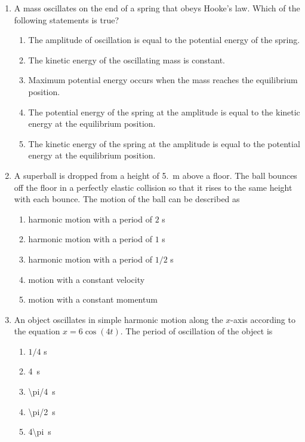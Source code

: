 \documentclass{../../oss-apphys}
\begin{document}
\begin{multicols}{2}
\begin{enumerate}[leftmargin=18pt]
  \item A mass oscillates on the end of a spring that obeys Hooke's law. Which
    of the following statements is true?
    \begin{enumerate}[noitemsep,topsep=0pt,leftmargin=18pt,label=(\Alph*)]
    \item The amplitude of oscillation is equal to the potential energy of the
      spring.
    \item The kinetic energy of the oscillating mass is constant.
    \item Maximum potential energy occurs when the mass reaches the
      equilibrium position.
    \item The potential energy of the spring at the amplitude is equal to the
      kinetic energy at the equilibrium position.
    \item The kinetic energy of the spring at the amplitude is equal to the
      potential energy at the equilibrium position.
    \end{enumerate}

  \item A superball is dropped from a height of \SI{5.}{\metre} above a floor.
    The ball bounces off the floor in a perfectly elastic collision so that it
    rises to the same height with each bounce. The motion of the ball can be
    described as
    \begin{enumerate}[noitemsep,topsep=0pt,leftmargin=18pt,label=(\Alph*)]
    \item harmonic motion with a period of $2$ \si{\second}
    \item harmonic motion with a period of $1$ \si{\second}
    \item harmonic motion with a period of $1/2$ \si{\second}
    \item motion with a constant velocity
    \item motion with a constant momentum
    \end{enumerate}

  \item An object oscillates in simple harmonic motion along the $x$-axis
    according to the equation $x = 6 \cos(4t)$. The period of oscillation of the
    object is
    \begin{enumerate}[noitemsep,topsep=0pt,leftmargin=18pt,label=(\Alph*)]
    \item $1/4$ \si{\second}
    \item\SI{4}{\second}
    \item\SI{\pi/4}{\second}
    \item\SI{\pi/2}{\second}
    \item\SI{4\pi}{\second}
    \end{enumerate}
    \columnbreak
    

\end{enumerate}
\end{multicols}
\end{document}
